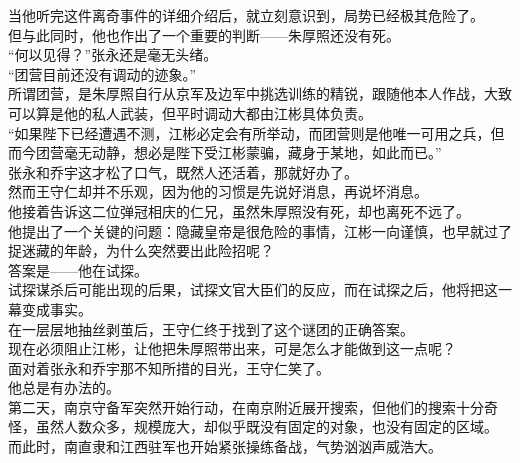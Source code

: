 \begin{multicols}{\theparacolNo}
当他听完这件离奇事件的详细介绍后，就立刻意识到，局势已经极其危险了。\\

但与此同时，他也作出了一个重要的判断——朱厚照还没有死。\\

“何以见得？”张永还是毫无头绪。\\

“团营目前还没有调动的迹象。”\\

所谓团营，是朱厚照自行从京军及边军中挑选训练的精锐，跟随他本人作战，大致可以算是他的私人武装，但平时调动大都由江彬具体负责。\\

“如果陛下已经遭遇不测，江彬必定会有所举动，而团营则是他唯一可用之兵，但而今团营毫无动静，想必是陛下受江彬蒙骗，藏身于某地，如此而已。”\\

张永和乔宇这才松了口气，既然人还活着，那就好办了。\\

然而王守仁却并不乐观，因为他的习惯是先说好消息，再说坏消息。\\

他接着告诉这二位弹冠相庆的仁兄，虽然朱厚照没有死，却也离死不远了。\\

他提出了一个关键的问题：隐藏皇帝是很危险的事情，江彬一向谨慎，也早就过了捉迷藏的年龄，为什么突然要出此险招呢？\\

答案是——他在试探。\\

试探谋杀后可能出现的后果，试探文官大臣们的反应，而在试探之后，他将把这一幕变成事实。\\

在一层层地抽丝剥茧后，王守仁终于找到了这个谜团的正确答案。\\

现在必须阻止江彬，让他把朱厚照带出来，可是怎么才能做到这一点呢？\\

面对着张永和乔宇那不知所措的目光，王守仁笑了。\\

他总是有办法的。\\

第二天，南京守备军突然开始行动，在南京附近展开搜索，但他们的搜索十分奇怪，虽然人数众多，规模庞大，却似乎既没有固定的对象，也没有固定的区域。\\

而此时，南直隶和江西驻军也开始紧张操练备战，气势汹汹声威浩大。\\


\end{multicols}
